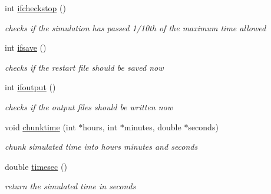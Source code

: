 \begin{CompactItemize}
int \hyperlink{structTimeProps_a5}{ifcheckstop} ()
\begin{CompactList}\small\item\em checks if the simulation has passed 1/10th of the maximum time allowed \item\end{CompactList}\item 
int \hyperlink{structTimeProps_a6}{ifsave} ()
\begin{CompactList}\small\item\em checks if the restart file should be saved now \item\end{CompactList}\item 
int \hyperlink{structTimeProps_a7}{ifoutput} ()
\begin{CompactList}\small\item\em checks if the output files should be written now \item\end{CompactList}\item 
void \hyperlink{structTimeProps_a8}{chunktime} (int $\ast$hours, int $\ast$minutes, double $\ast$seconds)
\begin{CompactList}\small\item\em chunk simulated time into hours minutes and seconds \item\end{CompactList}\item 
double \hyperlink{structTimeProps_a9}{timesec} ()
\begin{CompactList}\small\item\em return the simulated time in seconds \item\end{CompactList}\end{CompactItemize}
